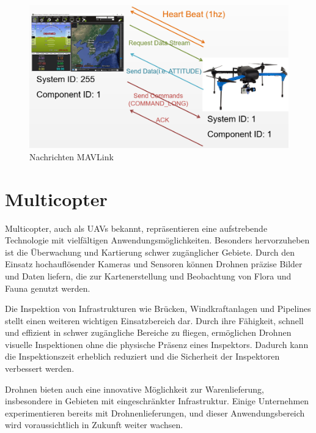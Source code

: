 \begin{figure}[H]
    \begin{centering}
        \includegraphics[scale=0.4]{images/mavlink-message-flow.png}
        \caption{\label{img mavlink}Nachrichten MAVLink \cite{imgmavlink}}
    \end{centering}
\end{figure}


\section{Multicopter} \label{drohne:section}



Multicopter, auch als \ac{UAV}s bekannt, repräsentieren eine aufstrebende Technologie mit vielfältigen Anwendungsmöglichkeiten. Besonders hervorzuheben ist die Überwachung und Kartierung schwer zugänglicher Gebiete. Durch den Einsatz hochauflösender Kameras und Sensoren können Drohnen präzise Bilder und Daten liefern, die zur Kartenerstellung und Beobachtung von Flora und Fauna genutzt werden.

Die Inspektion von Infrastrukturen wie Brücken, Windkraftanlagen und Pipelines stellt einen weiteren wichtigen Einsatzbereich dar. Durch ihre Fähigkeit, schnell und effizient in schwer zugängliche Bereiche zu fliegen, ermöglichen Drohnen visuelle Inspektionen ohne die physische Präsenz eines Inspektors. Dadurch kann die Inspektionszeit erheblich reduziert und die Sicherheit der Inspektoren verbessert werden.

Drohnen bieten auch eine innovative Möglichkeit zur Warenlieferung, insbesondere in Gebieten mit eingeschränkter Infrastruktur. Einige Unternehmen experimentieren bereits mit Drohnenlieferungen, und dieser Anwendungsbereich wird voraussichtlich in Zukunft weiter wachsen.

